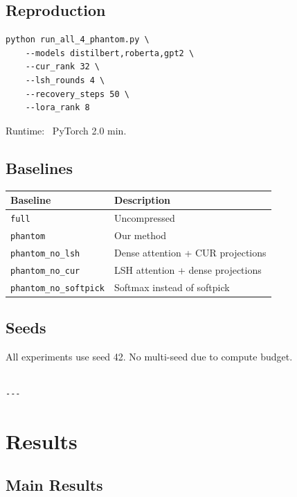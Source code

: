 \subsection{Reproduction}

\begin{lstlisting}
python run_all_4_phantom.py \
    --models distilbert,roberta,gpt2 \
    --cur_rank 32 \
    --lsh_rounds 4 \
    --recovery_steps 50 \
    --lora_rank 8
\end{lstlisting}

Runtime: ~PyTorch 2.0 min.

\subsection{Baselines}

\begin{table}[H]
\centering
\small
\begin{tabular}{ll}
\toprule
\textbf{Baseline} & \textbf{Description} \\
\midrule
\texttt{full} & Uncompressed \\
\texttt{phantom} & Our method \\
\texttt{phantom\_no\_lsh} & Dense attention + CUR projections \\
\texttt{phantom\_no\_cur} & LSH attention + dense projections \\
\texttt{phantom\_no\_softpick} & Softmax instead of softpick \\
\bottomrule
\end{tabular}
\end{table}

\subsection{Seeds}

All experiments use seed 42. No multi-seed due to compute budget.
\begin{lstlisting}

---
\end{lstlisting}


\section{Results}

\subsection{Main Results}

